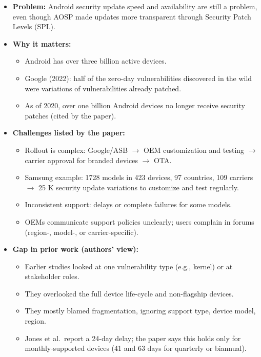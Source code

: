 \documentclass[11pt,a4paper]{article}
\begin{document}
\begin{enumerate}
    \begin{itemize}[leftmargin=*,itemsep=1pt,topsep=2pt]
        \item \textbf{Problem:} Android security update speed and availability are still a problem, even though AOSP made updates more transparent through Security Patch Levels (SPL).
        \item \textbf{Why it matters:}
        \begin{itemize}[itemsep=0pt]
            \item Android has over three billion active devices.
            \item Google (2022): half of the zero-day vulnerabilities discovered in the wild were variations of vulnerabilities already patched.
            \item As of 2020, over one billion Android devices no longer receive security patches (cited by the paper).
        \end{itemize}
        \item \textbf{Challenges listed by the paper:}
        \begin{itemize}[itemsep=0pt]
            \item Rollout is complex: Google/ASB $\rightarrow$ OEM customization and testing $\rightarrow$ carrier approval for branded devices $\rightarrow$ OTA.
            \item Samsung example: 1728 models in 423 devices, 97 countries, 109 carriers $\rightarrow$ 25 K security update variations to customize and test regularly.
            \item Inconsistent support: delays or complete failures for some models.
            \item OEMs communicate support policies unclearly; users complain in forums (region-, model-, or carrier-specific).
        \end{itemize}
        \item \textbf{Gap in prior work (authors' view):}
        \begin{itemize}[itemsep=0pt]
            \item Earlier studies looked at one vulnerability type (e.g., kernel) or at stakeholder roles.
            \item They overlooked the full device life-cycle and non-flagship devices.
            \item They mostly blamed fragmentation, ignoring support type, device model, region.
            \item Jones et al.\ report a 24-day delay; the paper says this holds only for monthly-supported devices (41 and 63 days for quarterly or biannual).

\end{itemize}
\end{itemize}
\end{enumerate}
\end{document}

